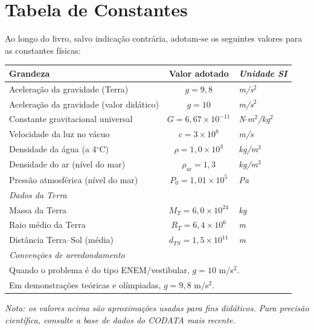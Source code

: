 
\chapter*{Tabela de Constantes}

Ao longo do livro, salvo indicação contrária, adotam-se os seguintes
valores para as constantes físicas:

\vspace{1em}

\begin{center}
\renewcommand{\arraystretch}{1.4}
\begin{tabular}{l c >{\itshape}l}
\toprule
\textbf{Grandeza} & \textbf{Valor adotado} & \textnormal{\textbf{Unidade SI}} \\
\midrule
Aceleração da gravidade (Terra)              & $g = 9{,}8$    & m/s$^2$ \\
Aceleração da gravidade (valor didático)     & $g = 10$       & m/s$^2$ \\
Constante gravitacional universal            & $G = 6{,}67 \times 10^{-11}$ & N$\cdot$m$^2$/kg$^2$ \\
Velocidade da luz no vácuo                   & $c = 3 \times 10^{8}$        & m/s \\
Densidade da água (a 4$^\circ$C)             & $\rho = 1{,}0 \times 10^{3}$ & kg/m$^3$ \\
Densidade do ar (nível do mar)               & $\rho_\text{ar} = 1{,}3$     & kg/m$^3$ \\
Pressão atmosférica (nível do mar)           & $P_0 = 1{,}01 \times 10^{5}$ & Pa \\
\midrule
\multicolumn{3}{l}{\itshape Dados da Terra} \\
Massa da Terra                               & $M_T = 6{,}0 \times 10^{24}$ & kg \\
Raio médio da Terra                          & $R_T = 6{,}4 \times 10^{6}$  & m \\
Distância Terra--Sol (média)                 & $d_{TS} = 1{,}5 \times 10^{11}$ & m \\
\midrule
\multicolumn{3}{l}{\itshape Convenções de arredondamento} \\
\multicolumn{3}{l}{\small Quando o problema é do tipo ENEM/vestibular, $g = 10$ m/s$^2$.} \\
\multicolumn{3}{l}{\small Em demonstrações teóricas e olímpiadas, $g = 9{,}8$ m/s$^2$.} \\
\bottomrule
\end{tabular}
\end{center}

\vspace{1em}

\noindent\textit{Nota: os valores acima são aproximações usadas para fins
didáticos. Para precisão científica, consulte a base de dados do
CODATA mais recente.}

\clearpage
